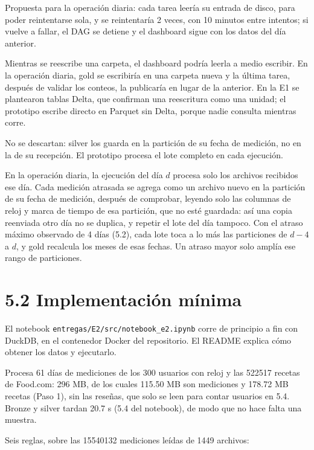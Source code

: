 \documentclass[11pt]{article}
\begin{document}
Propuesta para la operación diaria: cada tarea leería su entrada de disco,
para poder reintentarse sola, y se reintentaría 2 veces, con 10 minutos
entre intentos; si vuelve a fallar, el DAG se detiene y el dashboard sigue con
los datos del día anterior.

Mientras se reescribe una carpeta, el dashboard podría leerla a medio
escribir. En la operación diaria, gold se escribiría en una carpeta nueva y la
última tarea, después de validar los conteos, la publicaría en lugar de la
anterior. En la E1 se plantearon tablas Delta, que confirman una reescritura como una
unidad; el prototipo escribe directo en Parquet sin Delta, porque nadie
consulta mientras corre.

 No se
descartan: silver los guarda en la partición de su fecha de medición, no en la
de su recepción. El prototipo procesa el lote completo en cada ejecución.

En la operación diaria, la ejecución del día $d$ procesa solo los archivos
recibidos ese día. Cada medición atrasada se agrega como un archivo nuevo en la
partición de su fecha de medición, después de comprobar, leyendo solo las
columnas de reloj y marca de tiempo de esa partición, que no esté guardada:
así una copia reenviada otro día no se duplica, y repetir el lote del día
tampoco. Con el atraso máximo observado de 4 días (5.2), cada lote toca a lo
más las particiones de $d-4$ a $d$, y gold recalcula los meses de esas fechas.
Un atraso mayor solo amplía ese rango de particiones.

\section{5.2 Implementación mínima}

El notebook \texttt{entregas/E2/src/notebook\_e2.ipynb} corre de principio a fin con
DuckDB, en el contenedor Docker del repositorio. El README explica cómo
obtener los datos y ejecutarlo.

Procesa 61 días de mediciones de los 300 usuarios con reloj y las 522517
recetas de Food.com: 296 MB, de los cuales 115.50 MB son mediciones y 178.72
MB recetas (Paso 1), sin las reseñas, que solo se leen para contar usuarios en
5.4. Bronze y silver tardan 20.7 s (5.4 del notebook), de modo que no hace
falta una muestra.

 Seis reglas, sobre las 15540132 mediciones leídas de 1449 archivos:
\end{document}
